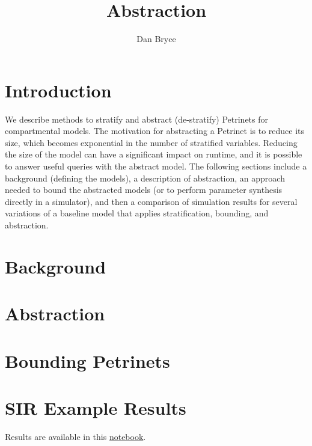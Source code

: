 \documentclass[10pt,letterpaper]{article}
\title{\funman Abstraction}
\author{Dan Bryce}
\begin{document}
\maketitle

\section{Introduction}

We describe methods to stratify and abstract (de-stratify) Petrinets for compartmental models.  The motivation for abstracting a Petrinet is to reduce its size, which becomes exponential in the number of stratified variables.  Reducing the size of the model can have a significant impact on runtime, and it is possible to answer useful queries with the abstract model.  The following sections include a background (defining the models), a description of abstraction, an approach needed to bound the abstracted models (or to perform parameter synthesis directly in a simulator), and then a comparison of simulation results for several variations of a baseline model that applies stratification, bounding, and abstraction.  

\section{Background}


\section{Abstraction}


\section{Bounding Petrinets}


\section{SIR Example Results}
Results are available in this \href{https://github.com/siftech/funman/blob/sep-monthly-demo/notebooks/abstraction-bounding-demo.ipynb}{notebook}.
% 

% 
\end{document}

